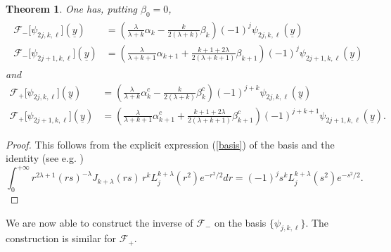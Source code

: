 \documentclass{amsart}
\newtheorem{theorem}{Theorem}[section]
\theoremstyle{remark}
\begin{document}
\begin{theorem}
\label{eigenvalues}
One has, putting $\beta_{0}=0$,
\begin{align}\label{eigenvalue eq}
\begin{split}
{\mathcal{F}}_{-}\lbrack \psi_{2j,k,\ell}\rbrack ({\underline{y}}) & = \left(\frac{{\lambda}}{{{\lambda}}+k} \alpha_{k} - \frac{k}{2({{\lambda}}+k)} \beta_{k} \right)(-1)^{j}\psi_{2j,k,\ell}({\underline{y}})\\
{\mathcal{F}}_{-}\lbrack \psi_{2j+1,k,\ell}\rbrack ({\underline{y}}) & = \left(\frac{{\lambda}}{{{\lambda}}+k+1} \alpha_{k+1} + \frac{k+1+2{{\lambda}}}{2({{\lambda}}+k+1)} \beta_{k+1} \right)(-1)^{j}\psi_{2j+1,k,\ell}({\underline{y}})
\end{split}
\end{align}
and 
\begin{align*}
{\mathcal{F}}_{+}\lbrack \psi_{2j,k,\ell}\rbrack ({\underline{y}}) & = \left(\frac{{\lambda}}{{{\lambda}}+k} \alpha_{k}^c - \frac{k}{2({{\lambda}}+k)} \beta_{k}^c \right)(-1)^{j+k}\psi_{2j,k,\ell}({\underline{y}})\\
{\mathcal{F}}_{+}\lbrack \psi_{2j+1,k,\ell}\rbrack ({\underline{y}}) & = \left(\frac{{\lambda}}{{{\lambda}}+k+1} \alpha_{k+1}^c + \frac{k+1+2{{\lambda}}}{2({{\lambda}}+k+1)} \beta_{k+1}^c \right)(-1)^{j+k+1}\psi_{2j+1,k,\ell}({\underline{y}}).
\end{align*}
\end{theorem}

\begin{proof}
This follows from the explicit expression (\ref{basis}) of the basis and the identity (see e.g. \cite[exercise 21, p. 371]{Sz})
\[
\int_{0}^{+\infty} r^{2{{\lambda}}+1} (rs)^{-{{\lambda}}} J_{k+{{\lambda}}}(rs)\, r^{k} L_{j}^{k+{{\lambda}}}(r^{2}) e^{-r^{2}/2}dr = (-1)^{j}s^{k} L_{j}^{k+{{\lambda}}}(s^{2}) e^{-s^{2}/2}. 
\]
\end{proof}

We are now able to construct the inverse of ${\mathcal{F}}_{-}$ on the basis $\{\psi_{j,k,\ell}\}$. The construction is similar for ${\mathcal{F}}_{+}$.
\end{document}
